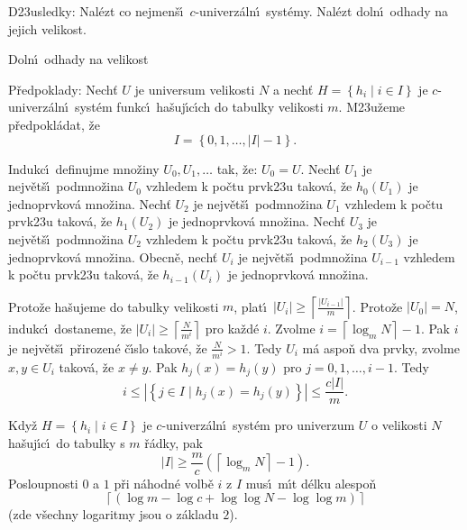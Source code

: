 \flushpar D\accent23usledky: Nal\'ezt co nejmen\v s\'\i\ $c$-univerz\'aln\'\i\ 
syst\'emy. Nal\'ezt doln\'\i\ odhady na jejich velikost.
\medskip

\subhead
Doln\'\i\ odhady na velikost
\endsubhead
\smallskip

\flushpar P\v redpoklady: Nech\v t $U$ je universum velikosti $N$ a nech\v t 
$H=\left\{h_i\mid i\in I\right\}$ je $c$-univerz\'aln\'\i\ syst\'em funkc\'\i\ ha\v suj\'\i c\'\i ch do tabulky velikosti 
$m$. M\accent23u\v zeme p\v redpokl\'a\-dat, \v ze $$I=\left\{0,1,\dots
,|I|-1\right\}.$$
\medskip

\flushpar Indukc\'\i\ definujme mno\v ziny $U_0,U_1,\dots$ tak, \v ze: 
$U_0=U$.\newline 
Nech\v t $U_1$ je nejv\v et\v s\'\i\ podmno\v zina $U_0$ vzhledem k po\v ctu 
prvk\accent23u takov\'a, \v ze $h_0\left(U_1\right)$ je jednoprvkov\'a 
mno\v zina. \newline 
Nech\v t $U_2$ je nejv\v et\v s\'\i\ podmno\v zina $U_1$ vzhledem k po\v ctu 
prvk\accent23u takov\'a, \v ze $h_1\left(U_2\right)$ je jednoprvkov\'a 
mno\v zina. \newline 
Nech\v t $U_3$ je nejv\v et\v s\'\i\ podmno\v zina $U_2$ vzhledem k po\v ctu 
prvk\accent23u takov\'a, \v ze $h_2\left(U_3\right)$ je jednoprvkov\'a 
mno\v zina. \newline 
Obecn\v e, nech\v t $U_i$ je nejv\v et\v s\'\i\ podmno\v zina $U_{
i-1}$ vzhledem k po\v ctu 
prvk\accent23u takov\'a, \v ze $h_{i-1}\left(U_i\right)$ je jednoprvkov\'a 
mno\v zina. 
\medskip

\flushpar Proto\v ze ha\v sujeme do tabulky velikosti $m$, plat\'\i\ 
$|U_i|\ge\left\lceil\frac {|U_{i-1}|}m\right\rceil$. Proto\v ze $|U_0|=N$, indukc\'\i\ dostaneme, \v ze 
$|U_i|\ge\left\lceil\frac N{m^i}\right\rceil$ pro ka\v zd\'e $i$. Zvolme $i=
\left\lceil\log_mN\right\rceil -1$. Pak $i$ je 
nejv\v et\v s\'\i\ p\v rirozen\'e \v c\'\i slo takov\'e, \v ze $\frac 
N{m^i}>1$. Tedy $U_i$ m\'a 
aspo\v n dva prvky, zvolme $x,y\in U_i$ takov\'a, \v ze $x\ne y$. Pak 
$h_j\left(x\right)=h_j\left(y\right)$ pro $j=0,1,\dots,i-1$. Tedy 
$$i\le |\left\{j\in I\mid h_j\left(x\right)=h_j\left(y\right)\right\}|\le\frac {c|I|}m.$$
\medskip

Kdy\v z $H=\left\{h_i\mid i\in I\right\}$ je $c$-univerz\'aln\'\i\ syst\'em pro 
univerzum $U$ o velikosti $N$ ha\v suj\'\i c\'\i\ do tabulky s $m$ \v r\'adky, pak 
$$|I|\ge\frac mc\left(\left\lceil\log_mN\right\rceil -1\right).$$
Posloupnosti $0$ a $1$ p\v ri n\'ahodn\'e volb\v e $i$ z $I$ mus\'\i\ m\'\i t 
d\'elku alespo\v n $$\left\lceil \left(\log m-\log c+\log\log N-\log\log m\right)\right\rceil$$ (zde v\v sechny logaritmy 
jsou o z\'akladu $2$).
\endproclaim
\medskip

